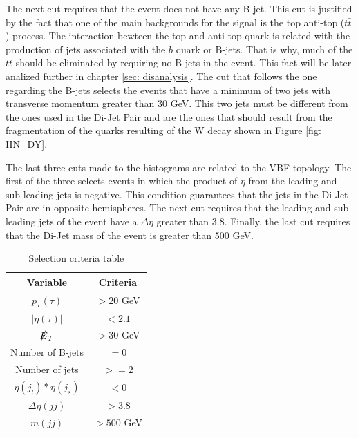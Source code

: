 The next cut requires that the event does not have any B-jet. This cut is justified by the fact that one of the main backgrounds for the signal is the top anti-top ($t\bar{t}$) process. The interaction bewteen the top and anti-top quark is related with the production of jets associated with the $b$ quark or B-jets. That is why, much of the $t\bar{t}$ should be eliminated by requiring no B-jets in the event. This fact will be later analized further in chapter \ref{sec: disanalysis}. The cut that follows the one regarding the B-jets selects the events that have a minimum of two jets with transverse momentum greater than 30 GeV. This two jets must be different from the ones used in the Di-Jet Pair and are the ones that should result from the fragmentation of the quarks resulting of the W decay shown in Figure \ref{fig: HN_DY}.

The last three cuts made to the histograms are related to the VBF topology. The first of the three selects events in which the product of $\eta$ from the leading and sub-leading jets is negative. This condition guarantees that the jets in the Di-Jet Pair are in opposite hemispheres. The next cut requires that the leading and sub-leading jets of the event have a $\Delta \eta$ greater than 3.8. Finally, the last cut requires that the Di-Jet mass of the event is greater than 500 GeV.

\begin{table}
\centering
\begin{tabular}{|c|c|}
\hline
Variable & Criteria \\
\hline
$p_{T}(\tau)$ & $> 20$ GeV \\
$|\eta(\tau)|$ & $< 2.1$ \\ 
$\slashed{E}_{T}$ & $> 30$ GeV \\
Number of B-jets & $= 0$ \\
Number of jets & $ >= 2$ \\
$\eta(j_{l})*\eta(j_{s})$ & $<0$ \\
$\Delta \eta(jj)$ & $ > 3.8$ \\
$m(jj)$ & $> 500$ GeV \\
\hline
\end{tabular}
\caption{Selection criteria table}
\label{table: cuts}
\end{table}
